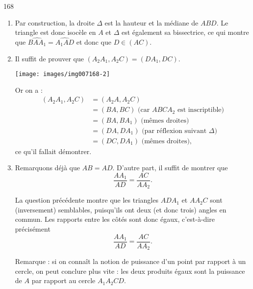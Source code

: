 \begin{Soln}{168}
\begin{enumerate}
\item Par construction, la droite $\Delta$ est la hauteur et la médiane de $ABD$. Le triangle est donc isocèle en $A$ et $\Delta$ est également sa bissectrice, ce qui montre que $\widehat{BAA_1} = \widehat{A_1AD}$ et donc que $D\in (AC)$.
\item Il suffit de prouver que $(A_2A_1,A_2C)=(DA_1,DC)$.
\begin{center}
\texttt{[image: images/img007168-2]}
\end{center}
Or on a :
\begin{align*}
(A_2A_1,A_2C)
&= (A_2A,A_2C)\\
&= (BA,BC) \text{ (car $ABCA_2$ est inscriptible)}\\
&= (BA,BA_1) \text{ (mêmes droites)}\\
&= (DA,DA_1) \text{ (par réflexion suivant $\Delta$)}\\
&= (DC,DA_1) \text{ (mêmes droites)},
\end{align*}
ce qu'il fallait démontrer.
\item Remarquons déjà que $AB=AD$.  D'autre part, il suffit de montrer que
\[ \frac{AA_1}{AD} = \frac{AC}{AA_2}.\]

La question précédente montre que les triangles $ADA_1$ et $AA_2C$ sont (inversement) semblables, puisqu'ils ont deux (et donc trois) angles en commun. Les rapports entre les côtés sont donc égaux, c'est-à-dire précisément
\[ \frac{AA_1}{AD} = \frac{AC}{AA_2}.\]

Remarque : si on connaît la notion de puissance d'un point par rapport à un cercle, on peut conclure plus vite : les deux produits égaux sont la puissance de $A$ par rapport au cercle $A_1A_2CD$.
\end{enumerate}
\end{Soln}

